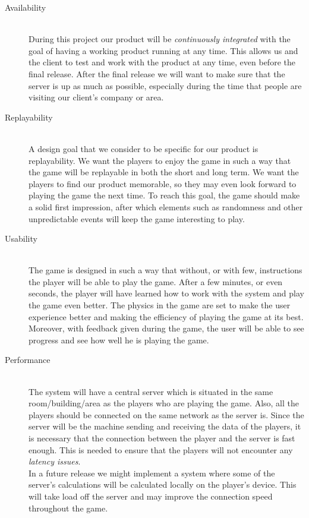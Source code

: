 \documentclass[11pt,twoside,a4paper]{article}
\begin{document}
\begin{description}
\item[Availability] \hfill \\
    During this project our product will be \emph{continuously integrated} with the goal of having a working product running at any time. This allows us and the client to test and work with the product at any time, even before the final release.
After the final release we will want to make sure that the server is up as much as possible, especially during the time that people are visiting our client's company or area. 
\item[Replayability] \hfill \\
    A design goal that we consider to be specific for our product is replayability. We want the players to enjoy the game in such a way that the game will be replayable in both the short and long term. We want the players to find our product memorable, so they may even look forward to playing the game the next time. To reach this goal, the game should make a solid first impression, after which elements such as randomness and other unpredictable events will keep the game interesting to play.
\item[Usability] \hfill \\
    The game is designed in such a way that without, or with few, instructions the player will be able to play the game. After a few minutes, or even seconds, the player will have learned how to work with the system and play the game even better. The physics in the game are set to make the user experience better and making the efficiency of playing the game at its best. \\
        Moreover, with feedback given during the game, the user will be able to see progress and see how well he is playing the game.
\item[Performance] \hfill \\
    The system will have a central server which is situated in the same room/building/area as the players who are playing the game. Also, all the players should be connected on the same network as the server is. Since the server will be the machine sending and receiving the data of the players, it is necessary that the connection between the player and the server is fast enough. This is needed to ensure that the players will not encounter any \emph{latency issues}. \\
    In a future release we might implement a system where some of the server's calculations will be calculated locally on the player's device. This will take load off the server and may improve the connection speed throughout the game.
    
\end{description}
\end{document}

